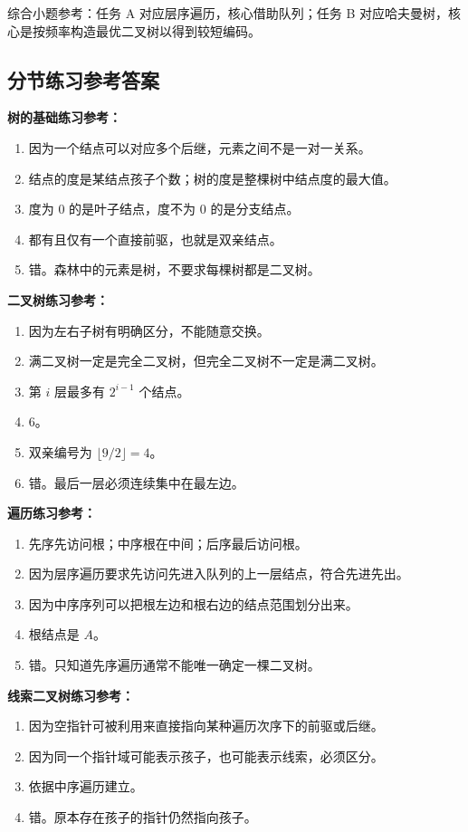 \documentclass{../../note}
\begin{document}
综合小题参考：任务 A 对应层序遍历，核心借助队列；任务 B 对应哈夫曼树，核心是按频率构造最优二叉树以得到较短编码。

\subsection{分节练习参考答案}

\textbf{树的基础练习参考：}

\begin{enumerate}
  \item 因为一个结点可以对应多个后继，元素之间不是一对一关系。
  \item 结点的度是某结点孩子个数；树的度是整棵树中结点度的最大值。
  \item 度为 0 的是叶子结点，度不为 0 的是分支结点。
  \item 都有且仅有一个直接前驱，也就是双亲结点。
  \item 错。森林中的元素是树，不要求每棵树都是二叉树。
\end{enumerate}

\textbf{二叉树练习参考：}

\begin{enumerate}
  \item 因为左右子树有明确区分，不能随意交换。
  \item 满二叉树一定是完全二叉树，但完全二叉树不一定是满二叉树。
  \item 第 $i$ 层最多有 $2^{i-1}$ 个结点。
  \item 6。
  \item 双亲编号为 $\lfloor 9/2 \rfloor = 4$。
  \item 错。最后一层必须连续集中在最左边。
\end{enumerate}

\textbf{遍历练习参考：}

\begin{enumerate}
  \item 先序先访问根；中序根在中间；后序最后访问根。
  \item 因为层序遍历要求先访问先进入队列的上一层结点，符合先进先出。
  \item 因为中序序列可以把根左边和根右边的结点范围划分出来。
  \item 根结点是 $A$。
  \item 错。只知道先序遍历通常不能唯一确定一棵二叉树。
\end{enumerate}

\textbf{线索二叉树练习参考：}

\begin{enumerate}
  \item 因为空指针可被利用来直接指向某种遍历次序下的前驱或后继。
  \item 因为同一个指针域可能表示孩子，也可能表示线索，必须区分。
  \item 依据中序遍历建立。
  \item 错。原本存在孩子的指针仍然指向孩子。
\end{enumerate}
\end{document}
